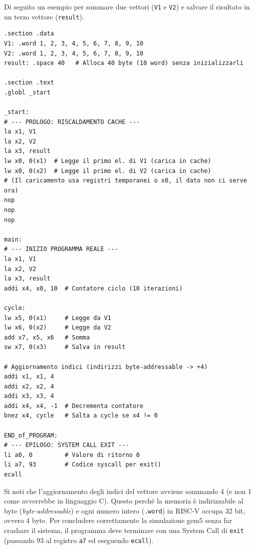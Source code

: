 \begin{example}
Di seguito un esempio per sommare due vettori (\texttt{V1} e \texttt{V2}) e salvare il risultato in un terzo vettore (\texttt{result}). 

\begin{verbatim}
.section .data
V1: .word 1, 2, 3, 4, 5, 6, 7, 8, 9, 10
V2: .word 1, 2, 3, 4, 5, 6, 7, 8, 9, 10
result: .space 40   # Alloca 40 byte (10 word) senza inizializzarli

.section .text
.globl _start

_start:
# --- PROLOGO: RISCALDAMENTO CACHE ---
la x1, V1
la x2, V2
la x3, result
lw x0, 0(x1)  # Legge il primo el. di V1 (carica in cache)
lw x0, 0(x2)  # Legge il primo el. di V2 (carica in cache)
# (Il caricamento usa registri temporanei o x0, il dato non ci serve ora)
nop
nop
nop

main:
# --- INIZIO PROGRAMMA REALE ---
la x1, V1
la x2, V2
la x3, result
addi x4, x0, 10  # Contatore ciclo (10 iterazioni)

cycle:
lw x5, 0(x1)     # Legge da V1
lw x6, 0(x2)     # Legge da V2
add x7, x5, x6   # Somma
sw x7, 0(x3)     # Salva in result

# Aggiornamento indici (indirizzi byte-addressable -> +4)
addi x1, x1, 4
addi x2, x2, 4
addi x3, x3, 4
addi x4, x4, -1  # Decrementa contatore
bnez x4, cycle   # Salta a cycle se x4 != 0

END_of_PROGRAM:
# --- EPILOGO: SYSTEM CALL EXIT ---
li a0, 0         # Valore di ritorno 0
li a7, 93        # Codice syscall per exit()
ecall
\end{verbatim}
\end{example}

\begin{remark}
Si noti che l'aggiornamento degli indici del vettore avviene sommando 4 (e non 1 come avverrebbe in linguaggio C). Questo perché la memoria è indirizzabile al byte (\textit{byte-addressable}) e ogni numero intero (\texttt{.word}) in RISC-V occupa 32 bit, ovvero 4 byte. 
Per concludere correttamente la simulazione gem5 senza far crashare il sistema, il programma deve terminare con una System Call di \texttt{exit} (passando 93 al registro \texttt{a7} ed eseguendo \texttt{ecall}).
\end{remark}